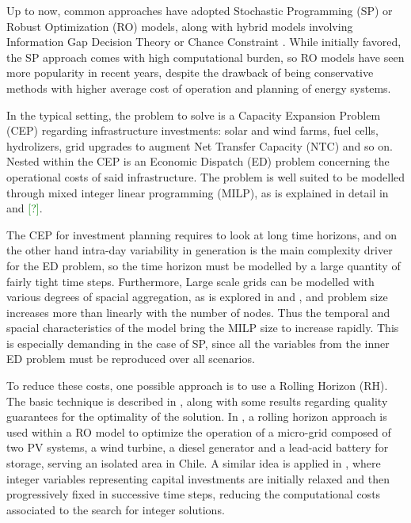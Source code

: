 Up to now, common approaches have adopted Stochastic Programming (SP) or Robust Optimization (RO) models, along with hybrid
 models involving Information Gap Decision Theory or Chance Constraint \textcolor{green}{\cite{review_math_opt}}. 
While initially favored, the SP approach comes with high computational burden, so RO models have seen more popularity 
in recent years, despite the drawback of being conservative methods with higher average cost of operation and planning of energy systems.

In the typical setting, the problem to solve is a Capacity Expansion Problem (CEP) regarding infrastructure investments:
 solar and wind farms, fuel cells, hydrolizers, grid upgrades to augment Net Transfer Capacity (NTC) and so on. 
Nested within the CEP is an Economic Dispatch (ED) problem concerning the operational costs of said infrastructure. 
The problem is well suited to be modelled through mixed integer linear programming (MILP), as is explained in detail in 
\textcolor{green}{\cite{INTRO_isolated_MIP}} and \textcolor{green}{[?]}.%

The CEP for investment planning requires to look at long time horizons, and on the other hand intra-day variability in generation is the main complexity driver for the ED problem, so the time horizon must be modelled by a large quantity of fairly tight time steps. 
Furthermore, Large scale grids can be modelled with various degrees of spacial aggregation, as is explored in \textcolor{green}{\cite{Horsch}} and \textcolor{green}{\cite{BIENER2020106349}}, and problem size increases more than linearly with the number of nodes.
Thus the temporal and spacial characteristics of the model bring the MILP size to increase rapidly. 
This is especially demanding in the case of SP, since all the variables from the inner ED problem must be reproduced over all scenarios.

To reduce these costs, one possible approach is to use a Rolling Horizon (RH). 
The basic technique is described in \textcolor{green}{\cite{INTRO_Glomb}}, along with some results regarding quality guarantees for the optimality of the solution. 
In \textcolor{green}{\cite{INTRO_Palma-Behnke}}, a rolling horizon approach is used within a RO model to optimize the operation of a micro-grid composed of two PV systems, a wind turbine, a diesel generator and a lead-acid battery for storage, serving an isolated area in Chile. 
A similar idea is applied in \textcolor{green}{\cite{INTRO_karlsruhe}}, 
where integer variables representing capital investments are initially relaxed 
and then progressively fixed in successive time steps, reducing the computational
 costs associated to the search for integer solutions.

